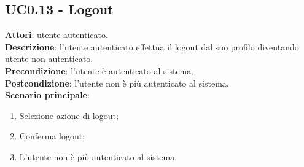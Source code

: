 \subsection{UC0.13 - Logout}{
	\label{uc0.13}
	\textbf{Attori}: utente autenticato.\\
	\textbf{Descrizione}: l'utente autenticato effettua il logout dal suo profilo diventando utente non autenticato.\\
	\textbf{Precondizione}: l'utente è autenticato al sistema.\\
	\textbf{Postcondizione}: l'utente non è più autenticato al sistema.\\
	\textbf{Scenario principale}:
	\begin{enumerate}
		\item Selezione azione di logout;
		\item Conferma logout;
		\item L'utente non è più autenticato al sistema.
	\end{enumerate}
}